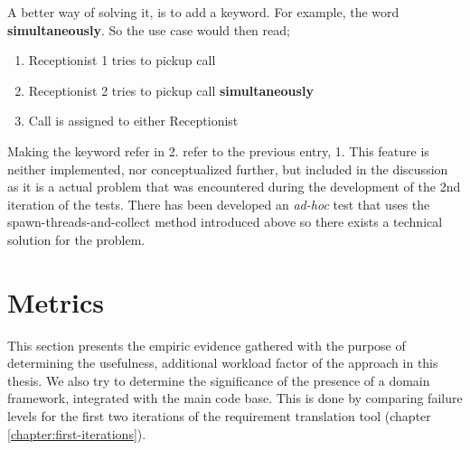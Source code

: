 \noindent A better way of solving it, is to add a keyword. For example, the word \textbf{simultaneously}. So the use case would then read;
\begin{enumerate}
 \item Receptionist 1 tries to pickup call
 \item Receptionist 2 tries to pickup call \textbf{simultaneously}
 \item Call is assigned to either Receptionist
\end{enumerate}
Making the keyword refer in 2. refer to the previous entry, 1. This feature is neither implemented, nor conceptualized further, but included in the discussion as it is a actual problem that was encountered during the development of the 2nd iteration of the tests. There has been developed an \emph{ad-hoc} test that uses the spawn-threads-and-collect method introduced above so there exists a technical solution for the problem.



\section{Metrics}
This section presents the empiric evidence gathered with the purpose of determining the usefulness, additional workload factor of the approach in this thesis. We also try to determine the significance of the presence of a domain framework, integrated with the main code base. This is done by comparing failure levels for the first two iterations of the requirement translation tool (chapter \ref{chapter:first-iterations}).
